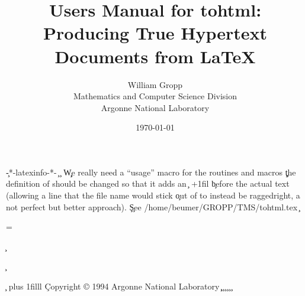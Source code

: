 \c -*-latexinfo-*-
\c \anltmtrue
\anltmfalse
\c\pagestyle{empty}
\c
\c We really need a ``usage'' macro for the routines and macros
\def\usage#1{}
\c
\c the definition of \file should be changed so that it adds an
\c {}\hskip 0pt +1fil 
\c before the actual text (allowing a line that the file name would stick
\c out of to instead be raggedright, a not perfect but better approach).
\c
\c See /home/beumer/GROPP/TMS/tohtml.tex
\c
\let\DOESupport\DefaultSupport

\def\tie{\nobreak\ \nobreak}
\def\bw{{\tt\char`\\}}
\textheight=9in
\textwidth=6.5in
\oddsidemargin=0in
\evensidemargin=0in
\topmargin=-0.5in
\hsize=\textwidth




\begin{ifinfo}
\c %
\title{Users Manual for tohtml:\\
Producing True Hypertext Documents from LaTeX}
\author{William Gropp\\
Mathematics and Computer Science Division\\
Argonne National Laboratory}

\date{\today}

\c %

\maketitle
\end{ifinfo}

\begin{iftex}


\end{iftex}

\clearpage

\c \vskip 0pt plus 1filll
\c Copyright \copyright{} 1994 Argonne National Laboratory
\c
\c \clearpage
\c {}
\c \setcounter{page}{3}
\c \pagestyle{plain}
\c \tableofcontents
\c \clearpage

\pagestyle{plain}
\thispagestyle{plain}

